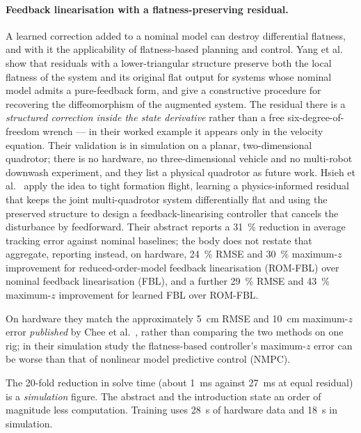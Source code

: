 \paragraph{Feedback linearisation with a flatness-preserving residual.}
A learned correction added to a nominal model can destroy differential flatness, and with it the
applicability of flatness-based planning and control. Yang et al.~\cite{yang2025flatnessresiduals}
show that residuals with a lower-triangular structure preserve both the local flatness of the system
and its original flat output for systems whose nominal model admits a pure-feedback form, and give
a constructive procedure for recovering the diffeomorphism of the augmented system. The residual
there is a \emph{structured correction inside the state derivative} rather than a free
six-degree-of-freedom wrench --- in their worked example it appears only in the velocity equation.
Their validation is in simulation on a planar, two-dimensional quadrotor; there is no hardware, no
three-dimensional vehicle and no multi-robot downwash experiment, and they list a physical quadrotor
as future work. Hsieh et
al.~\cite{hsieh2026flatness} apply the idea to tight formation flight, learning a physics-informed
residual that keeps the joint multi-quadrotor system differentially flat and using the preserved
structure to design a feedback-linearising controller that cancels the disturbance by feedforward.
Their abstract reports a \SI{31}{\percent} reduction in average tracking error against nominal
baselines; the body does not restate that aggregate, reporting instead, on hardware, \SI{24}{\percent}
RMSE and \SI{30}{\percent} maximum-\(z\) improvement for reduced-order-model feedback linearisation (ROM-FBL) over nominal feedback linearisation (FBL), and a further
\SI{29}{\percent} RMSE and \SI{43}{\percent} maximum-\(z\) improvement for learned FBL over
ROM-FBL.

On hardware they match the approximately \SI{5}{\centi\metre} RMSE and \SI{10}{\centi\metre}
maximum-\(z\) error \emph{published} by Chee et al.~\cite{chee2024knodedwmpc}, rather than
comparing the two methods on one rig; in their simulation study the flatness-based controller's
maximum-\(z\) error can be worse than that of nonlinear model predictive control (NMPC).

The \num{20}-fold reduction in solve time (about \SI{1}{\milli\second} against
\SI{27}{\milli\second} at equal residual) is a \emph{simulation} figure. The abstract and the
introduction state an order of magnitude less computation. Training uses \SI{28}{\second} of hardware data
and \SI{18}{\second} in simulation.

